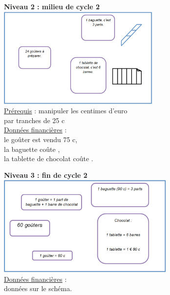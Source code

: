 {\begin{exercice*}
\begin{minipage}[t]{8cm}
   {\bf Niveau 2 : milieu de cycle 2} \\ [2mm]
   \includegraphics[height=5cm]{Grandeurs_mesures_did/Images/Grm7_activite_gouter2} \\
   \uline{Prérequis} : manipuler les centimes d'euro \\
   par tranches de 25 c \\ [2mm] 
   \uline{Données financières} : \\
   le goûter est vendu 75 c, \\
   la baguette coûte , \\
   la tablette de chocolat coûte .
\end{minipage}
\begin{minipage}[t]{8cm}
      {\bf Niveau 3 : fin de cycle 2} \\ [2mm]
      \includegraphics[height=5cm]{Grandeurs_mesures_did/Images/Grm7_activite_gouter3} \\
   \uline{Données financières} : \\
   données sur le schéma.
\end{minipage}

\ \\ [4mm]


\end{exercice*}}
